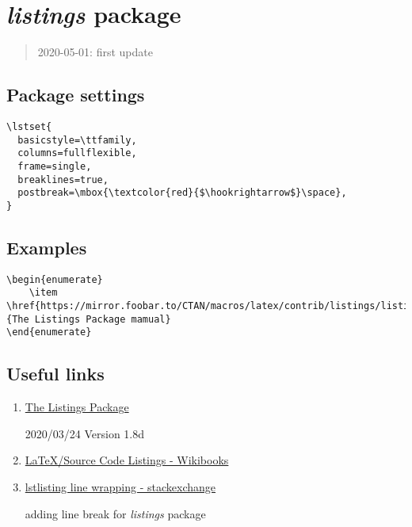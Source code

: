 \section{\textit{listings} package}

\begin{quote}
    2020-05-01: first update
\end{quote}


\subsection{Package settings}

\begin{lstlisting}[language=Tex]
\lstset{
  basicstyle=\ttfamily,
  columns=fullflexible,
  frame=single,
  breaklines=true,
  postbreak=\mbox{\textcolor{red}{$\hookrightarrow$}\space},
}
\end{lstlisting}


\subsection{Examples}

\begin{lstlisting}[language=Tex]
\begin{enumerate}
    \item \href{https://mirror.foobar.to/CTAN/macros/latex/contrib/listings/listings.pdf}{The Listings Package mamual}
\end{enumerate}
\end{lstlisting}


\subsection{Useful links}

\begin{enumerate}

    \item \href{https://mirror.foobar.to/CTAN/macros/latex/contrib/listings/listings.pdf}{The Listings Package}
    
    2020/03/24 Version 1.8d
    \item \href{https://en.wikibooks.org/wiki/LaTeX/Source_Code_Listings}{LaTeX/Source Code Listings - Wikibooks}
    \item \href{https://tex.stackexchange.com/questions/116534/lstlisting-line-wrapping/116572}{lstlisting line wrapping - stackexchange}
    
        adding line break for \textit{listings} package
    
\end{enumerate}
